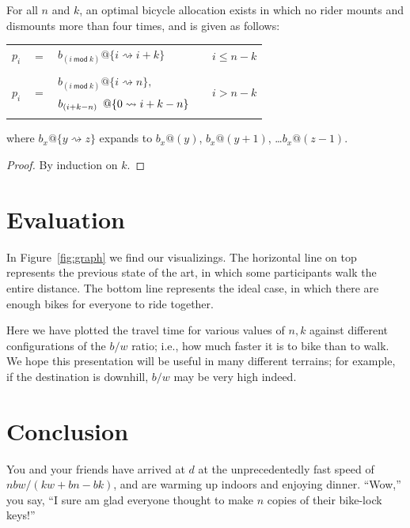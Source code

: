 \documentclass[DIV=calc, paper=a4, fontsize=11pt, twocolumn]{scrartcl}	 %
\newcommand{\initial}[1]{ %
\lettrine[lines=3,lhang=0.3,nindent=0em]{
\color{DarkGoldenrod}
{\textsf{#1}}}{}}
\begin{document}
\begin{theorem}
\label{thm:cont}
For all $n$ and $k$, an optimal bicycle allocation exists in which no rider mounts and dismounts more than four times, and is given as follows:
\newcommand\open{\{}
\newcommand\close{\}}
\begin{center}
\begin{tabular}{rclll}
	$p_i$ & $=$ & $b_{(i~\mathsf{mod}~k)}@ \open i \rightsquigarrow i+k \close$ && $i \le n-k$ \\
	\\
	\multirow{2}{*}{$p_i$} & \multirow{2}{*}{$=$} & $b_{(i~\mathsf{mod}~k)}@ \open i\rightsquigarrow n \close,$ && \multirow{2}{*}{$i > n-k$} \\
	& & $b_{(i+k-n)}\hspace{0.5em}@ \open 0 \rightsquigarrow i+k-n \close$ \\
	\\
\end{tabular}
\end{center}
where $b_x@\open y\rightsquigarrow z\close$ expands to $b_x@(y)$, $b_x@(y+1)$, \dots $b_x@(z-1)$.

\end{theorem}
\begin{proof}
By induction on $k$.
\end{proof}


\section{Evaluation}

\initial{I}n Figure~\ref{fig:graph} we find our visualizings.
The horizontal line on top represents the previous state of the art, in which some participants walk the entire distance.
The bottom line represents the ideal case, in which there are enough bikes for everyone to ride together.

Here we have plotted the travel time for various values of $n,k$ against different configurations of the $b/w$ ratio; i.e., how much faster it is to bike than to walk.
We hope this presentation will be useful in many different terrains; for example, if the destination is downhill, $b/w$ may be very high indeed.

\section{Conclusion}

\initial{Y}ou and your friends have arrived at $d$ at the unprecedentedly fast speed of $nbw/(kw+bn-bk)$, and are warming up indoors and enjoying dinner. ``Wow,'' you say, ``I sure am glad everyone thought to make $n$ copies of their bike-lock keys!''
\end{document}
